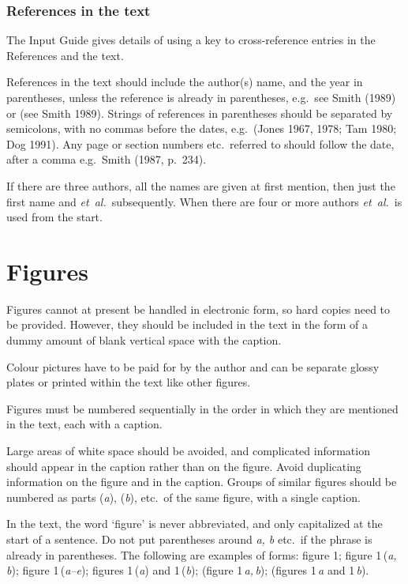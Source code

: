 \documentclass{jfm}
\newcommand\etal{\mbox{\textit{et al.}}}
\begin{document}
\subsubsection{References in the text}

The Input Guide gives details of using a key to cross-reference entries
in the References and the text.

References in the text should include the author(s) name, and the
year in parentheses, unless the reference is already in parentheses, e.g.\
see Smith (1989) or (see Smith 1989). Strings of references in parentheses
should be separated by semicolons, with no commas before the dates, e.g.\
(Jones 1967, 1978; Tam 1980; Dog 1991). Any page or section numbers etc.\
referred to should follow the date, after a comma e.g.\ Smith (1987,
p.~234).

If there are three authors, all the names are given at first mention, then
just the first name and \etal\ subsequently. When there are four or
more authors \etal\ is used from the start.


\section{Figures}

Figures cannot at present be handled in electronic form, so hard copies
need to be provided. However, they should be included in the text in the
form of a dummy amount of blank vertical space with the caption.

Colour pictures have to be paid for by the author and can be separate
glossy plates or printed within the text like other figures.

Figures must be numbered sequentially in the order in which they are
mentioned in the text, each with a caption.

Large areas of white space should be avoided, and complicated information
should appear in the caption rather than on the figure. Avoid duplicating
information on the figure and in the caption. Groups of similar
figures should be numbered as parts (\textit{a}), (\textit{b}), etc.\ of
the same figure, with a single caption.

In the text, the word `figure' is never abbreviated, and only capitalized at
the start of a sentence. Do not put parentheses around  \textit{a, b}
etc.\ if the phrase is already in parentheses. The following are
examples of forms: figure 1; figure 1\,(\textit{a,\,b});
figure 1\,(\textit{a--e}); figures 1\,(\textit{a}) and 1\,(\textit{b});
(figure 1\,\textit{a,\,b}); (figures 1\,\textit{a} and 1\,\textit{b}).
\end{document}
